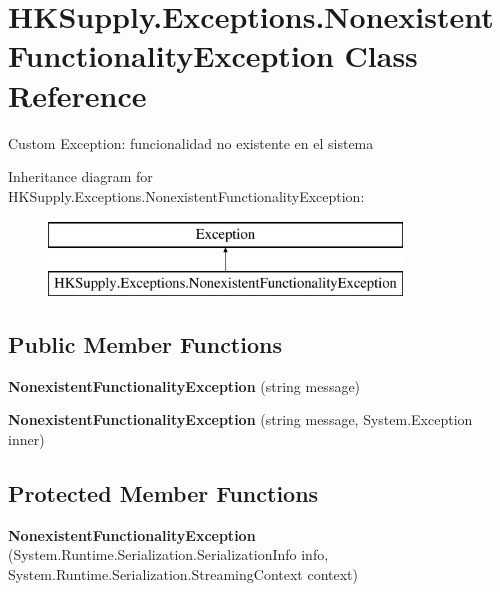 \hypertarget{class_h_k_supply_1_1_exceptions_1_1_nonexistent_functionality_exception}{}\section{H\+K\+Supply.\+Exceptions.\+Nonexistent\+Functionality\+Exception Class Reference}
\label{class_h_k_supply_1_1_exceptions_1_1_nonexistent_functionality_exception}


Custom Exception\+: funcionalidad no existente en el sistema  


Inheritance diagram for H\+K\+Supply.\+Exceptions.\+Nonexistent\+Functionality\+Exception\+:\begin{figure}[H]
\begin{center}
\leavevmode
\includegraphics[height=2.000000cm]{class_h_k_supply_1_1_exceptions_1_1_nonexistent_functionality_exception}
\end{center}
\end{figure}
\subsection*{Public Member Functions}
\begin{DoxyCompactItemize}
\item 
\mbox{\label{class_h_k_supply_1_1_exceptions_1_1_nonexistent_functionality_exception_a401756b880c4a3750896f980b505bc8c}} 
{\bfseries Nonexistent\+Functionality\+Exception} (string message)
\item 
\mbox{\label{class_h_k_supply_1_1_exceptions_1_1_nonexistent_functionality_exception_aa5e5ab000237411d1b13343128650cda}} 
{\bfseries Nonexistent\+Functionality\+Exception} (string message, System.\+Exception inner)
\end{DoxyCompactItemize}
\subsection*{Protected Member Functions}
\begin{DoxyCompactItemize}
\item 
\mbox{\label{class_h_k_supply_1_1_exceptions_1_1_nonexistent_functionality_exception_a3fd2d2660c1e6983a45a7031866e95e4}} 
{\bfseries Nonexistent\+Functionality\+Exception} (System.\+Runtime.\+Serialization.\+Serialization\+Info info, System.\+Runtime.\+Serialization.\+Streaming\+Context context)
\end{DoxyCompactItemize}


